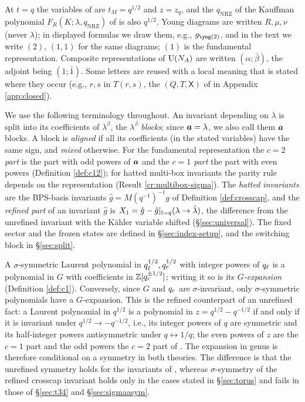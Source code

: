 At $t = q$ the variables of \cite{Marino09} are $t_M = q^{1/2}$ and $z = z_q$, and the $q_{\mathrm{NRZ}}$ of the Kauffman polynomial $F_R(K; \lambda, q_{\mathrm{NRZ}})$ of \cite{NRZ13} is also $q^{1/2}$. Young diagrams are written $R, \mu, \nu$ (never $\lambda$); in displayed formulas we draw them, e.g., $g_{\ytwo}$, and in the text we write $(2)$, $(1,1)$ for the same diagrams; $(1)$ is the fundamental representation. Composite representations of $\mathrm{U}(N_A)$ are written $(\alpha;\bar\beta)$, the adjoint being $(1;\bar1)$. Some letters are reused with a local meaning that is stated where they occur (e.g., $r, s$ in $T(r,s)$, the $(Q, T, \mathsf X)$ of \cite{AM22} in Appendix \ref{app:closed}).

We use the following terminology throughout. An invariant depending on $\lambda$ is split into its coefficients of $\lambda^\beta$, the $\lambda^\beta$ \emph{blocks}; since $\bm{a} = \lambda$, we also call them $\bm{a}$ blocks. A block is \emph{aligned} if all its coefficients (in the stated variables) have the same sign, and \emph{mixed} otherwise. For the fundamental representation the \emph{$c = 2$ part} is the part with odd powers of $\bm{a}$ and the \emph{$c = 1$ part} the part with even powers (Definition \ref{def:c12}); for hatted multi-box invariants the parity rule depends on the representation (Result \ref{cr:multibox-sigma}). The \emph{hatted invariants} are the BPS-basis invariants $\hat g = M(q^{-1})^{-1}g$ of Definition \ref{def:crosscap}, and the \emph{refined part} of an invariant $\hat g$ is $X_1 = \hat g - \hat g|_{t=q}(\lambda \to \tilde\lambda)$, the difference from the unrefined invariant with the K\"ahler variable shifted (\S\ref{sec:universal}). The fixed sector and the frozen states are defined in \S\ref{sec:index-setup}, and the switching block in \S\ref{sec:split}.

A $\sigma$-symmetric Laurent polynomial in $q_\ell^{1/2}, q_r^{1/2}$ with integer powers of $q_\ell$ is a polynomial in $G$ with coefficients in $\mathbb{Z}[q_r^{\pm1/2}]$; writing it so is its \emph{$G$-expansion} (Definition \ref{def:c1}). Conversely, since $G$ and $q_r$ are $\sigma$-invariant, only $\sigma$-symmetric polynomials have a $G$-expansion. This is the refined counterpart of an unrefined fact: a Laurent polynomial in $q^{1/2}$ is a polynomial in $z = q^{1/2} - q^{-1/2}$ if and only if it is invariant under $q^{1/2} \to -q^{-1/2}$, i.e., its integer powers of $q$ are symmetric and its half-integer powers antisymmetric under $q \leftrightarrow 1/q$; the even powers of $z$ are the $c = 1$ part and the odd powers the $c = 2$ part of \cite{Marino09}. The expansion in genus is therefore conditional on a symmetry in both theories. The difference is that the unrefined symmetry holds for the invariants of \cite{Marino09}, whereas $\sigma$-symmetry of the refined crosscap invariant holds only in the cases stated in \S\ref{sec:torus} and fails in those of \S\ref{sec:t34} and \S\ref{sec:sigmaasym}.

